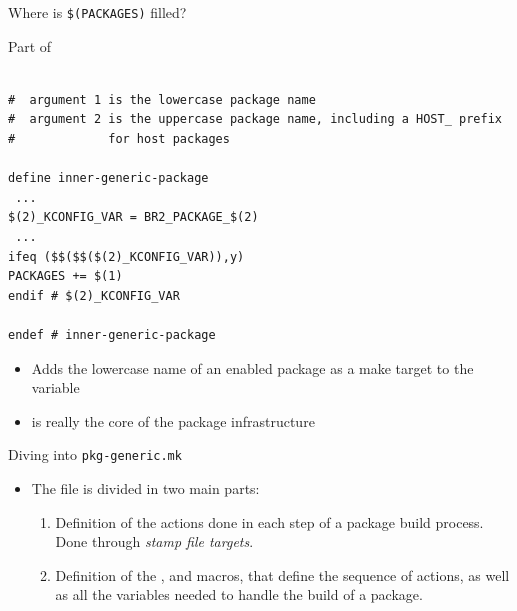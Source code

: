 \begin{frame}[fragile]{Where is {\tt \$(PACKAGES)} filled?}

\begin{block}{Part of }
\begin{verbatim}

#  argument 1 is the lowercase package name
#  argument 2 is the uppercase package name, including a HOST_ prefix
#             for host packages

define inner-generic-package
 ...
$(2)_KCONFIG_VAR = BR2_PACKAGE_$(2)
 ...
ifeq ($$($$($(2)_KCONFIG_VAR)),y)
PACKAGES += $(1)
endif # $(2)_KCONFIG_VAR

endef # inner-generic-package
\end{verbatim}
\end{block}

\begin{itemize}
\item Adds the lowercase name of an enabled package as a make target
  to the  variable
\item {} is really the core of the package
  infrastructure
\end{itemize}

\end{frame}

\begin{frame}{Diving into {\tt pkg-generic.mk}}

\begin{itemize}
\item The  file is divided in two main
  parts:
  \begin{enumerate}
  \item Definition of the actions done in each step of a package build
    process. Done through {\em stamp file targets}.
  \item Definition of the ,
     and  macros,
    that define the sequence of actions, as well as all the variables
    needed to handle the build of a package.
  \end{enumerate}
\end{itemize}

\end{frame}

